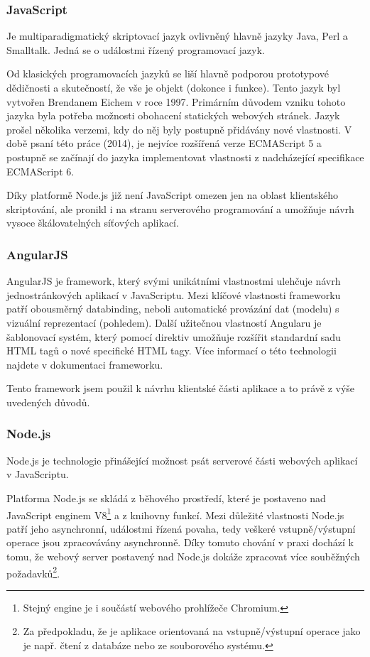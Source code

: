 \documentclass[ing,male,java,dept460,twoside]{diploma}						%
\begin{document}
\subsubsection{JavaScript}
\label{sec:JavaScript}
Je multiparadigmatický skriptovací jazyk ovlivněný hlavně jazyky Java, Perl a Smalltalk. Jedná se o událostmi řízený programovací jazyk.

Od klasických programovacích jazyků se liší hlavně podporou prototypové dědičnosti a skutečností, že vše je objekt (dokonce i funkce). Tento jazyk byl vytvořen Brendanem Eichem v roce 1997. Primárním důvodem vzniku tohoto jazyka byla potřeba možnosti obohacení statických webových stránek. Jazyk prošel několika verzemi, kdy do něj byly postupně přidávány nové vlastnosti. V době psaní této práce (2014), je nejvíce rozšířená verze ECMAScript 5 a postupně se začínají do jazyka implementovat vlastnosti z nadcházející specifikace ECMAScript 6.

Díky platformě Node.js již není JavaScript omezen jen na oblast klientského skriptování, ale pronikl i na stranu serverového programování a umožňuje návrh vysoce škálovatelných síťových aplikací.

\subsubsection{AngularJS}
AngularJS je framework, který svými unikátními vlastnostmi ulehčuje návrh jednostránkových aplikací v JavaScriptu. Mezi klíčové vlastnosti frameworku patří obousměrný databinding, neboli automatické provázání dat (modelu) s vizuální reprezentací (pohledem). Další užitečnou vlastností Angularu je šablonovací systém, který pomocí direktiv umožňuje rozšířit standardní sadu HTML tagů o nové specifické HTML tagy. Více informací o této technologii najdete v dokumentaci frameworku\cite{angulardocs}.

Tento framework jsem použil k návrhu klientské části aplikace a to právě z výše uvedených důvodů.

\subsubsection{Node.js}
\label{sec:NodeJs}
Node.js\cite{nodejs} je technologie přinášející možnost psát serverové části webových aplikací v JavaScriptu.

Platforma Node.js se skládá z běhového prostředí, které je postaveno nad JavaScript enginem V8\footnote{Stejný engine je i součástí webového prohlížeče Chromium.} a z knihovny funkcí. Mezi důležité vlastnosti Node.js patří jeho asynchronní, událostmi řízená povaha, tedy veškeré vstupně/výstupní operace jsou zpracovávány asynchronně. Díky tomuto chování v praxi dochází k tomu, že webový server postavený nad Node.js dokáže zpracovat více souběžných požadavků\footnote{Za předpokladu, že je aplikace orientovaná na vstupně/výstupní operace jako je např. čtení z databáze nebo ze souborového systému.}.
\end{document}
